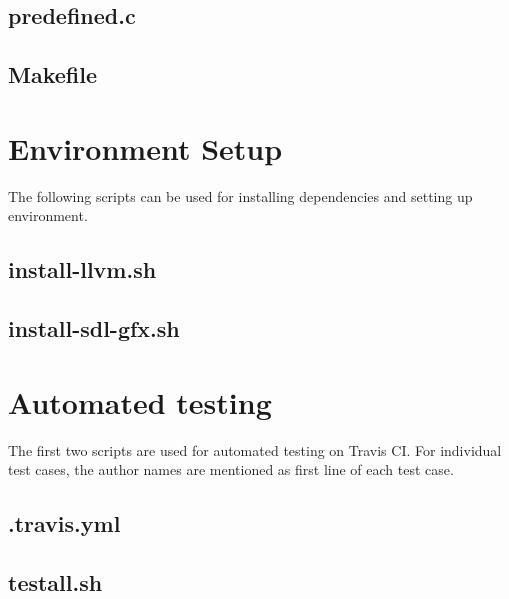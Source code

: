 \documentclass[letterpaper,12pt]{report}
\begin{document}
\begin{appendices}
    \section{predefined.c}
    

    \section{Makefile}
    


\chapter{Environment Setup}

The following scripts can be used for installing dependencies and setting up environment.

    \section{install-llvm.sh}
    

    \section{install-sdl-gfx.sh}
    

\chapter{Automated testing}

The first two scripts are used for automated testing on Travis CI. For individual test cases, the author names are mentioned as first line of each test case.

    \section{.travis.yml}
    

    \section{testall.sh}
    

    

\end{appendices}
\end{document}
